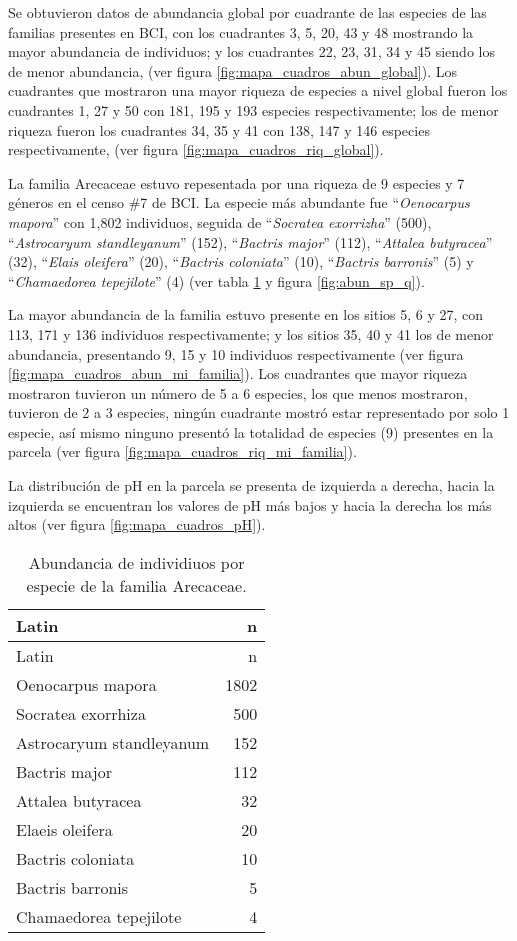 \documentclass[11pt,]{article}
\begin{document}
Se obtuvieron datos de abundancia global por cuadrante de las especies
de las familias presentes en BCI, con los cuadrantes 3, 5, 20, 43 y 48
mostrando la mayor abundancia de individuos; y los cuadrantes 22, 23,
31, 34 y 45 siendo los de menor abundancia, (ver figura
\ref{fig:mapa_cuadros_abun_global}). Los cuadrantes que mostraron una
mayor riqueza de especies a nivel global fueron los cuadrantes 1, 27 y
50 con 181, 195 y 193 especies respectivamente; los de menor riqueza
fueron los cuadrantes 34, 35 y 41 con 138, 147 y 146 especies
respectivamente, (ver figura \ref{fig:mapa_cuadros_riq_global}).

La familia Arecaceae estuvo repesentada por una riqueza de 9 especies y
7 géneros en el censo \#7 de BCI. La especie más abundante fue
``\emph{Oenocarpus mapora}'' con 1,802 individuos, seguida de
``\emph{Socratea exorrizha}'' (500), ``\emph{Astrocaryum standleyanum}''
(152), ``\emph{Bactris major}'' (112), ``\emph{Attalea butyracea}''
(32), ``\emph{Elais oleifera}'' (20), ``\emph{Bactris coloniata}'' (10),
``\emph{Bactris barronis}'' (5) y ``\emph{Chamaedorea tepejilote}'' (4)
(ver tabla \ref{tab:abun_sp} y figura \ref{fig:abun_sp_q}).

La mayor abundancia de la familia estuvo presente en los sitios 5, 6 y
27, con 113, 171 y 136 individuos respectivamente; y los sitios 35, 40 y
41 los de menor abundancia, presentando 9, 15 y 10 individuos
respectivamente (ver figura \ref{fig:mapa_cuadros_abun_mi_familia}). Los
cuadrantes que mayor riqueza mostraron tuvieron un número de 5 a 6
especies, los que menos mostraron, tuvieron de 2 a 3 especies, ningún
cuadrante mostró estar representado por solo 1 especie, así mismo
ninguno presentó la totalidad de especies (9) presentes en la parcela
(ver figura \ref{fig:mapa_cuadros_riq_mi_familia}).

La distribución de pH en la parcela se presenta de izquierda a derecha,
hacia la izquierda se encuentran los valores de pH más bajos y hacia la
derecha los más altos (ver figura \ref{fig:mapa_cuadros_pH}).

\begin{longtable}[]{@{}lr@{}}
\caption{\label{tab:abun_sp}Abundancia de individiuos por especie de la
familia Arecaceae.}\tabularnewline
\toprule
Latin & n\tabularnewline
\midrule
\endfirsthead
\toprule
Latin & n\tabularnewline
\midrule
\endhead
Oenocarpus mapora & 1802\tabularnewline
Socratea exorrhiza & 500\tabularnewline
Astrocaryum standleyanum & 152\tabularnewline
Bactris major & 112\tabularnewline
Attalea butyracea & 32\tabularnewline
Elaeis oleifera & 20\tabularnewline
Bactris coloniata & 10\tabularnewline
Bactris barronis & 5\tabularnewline
Chamaedorea tepejilote & 4\tabularnewline
\bottomrule
\end{longtable}
\end{document}
